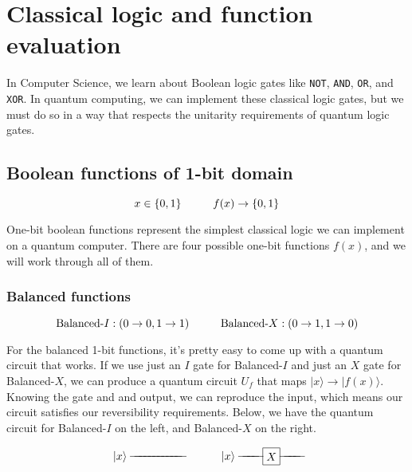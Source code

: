 \documentclass[12pt, letterpaper]{article}
\makeatletter
\def\w{\ar@{-}[l]}
\def\A#1{\save []="#1" \restore}
\def\op#1{*+[F]{\rule[-0.2ex]{0ex}{2.1ex}#1}}	%
\def\n{*-{}\w}
\def\>{\rangle}
\def\q#1{*+{\rule[-0.2ex]{0ex}{2.1ex}|#1\>}}
\makeatother
\begin{document}
\section{Classical logic and function evaluation}

In Computer Science, we learn about Boolean logic gates like \texttt{NOT},
\texttt{AND}, \texttt{OR}, and \texttt{XOR}. In quantum computing, we can implement these classical logic gates, but we must do so in a way that respects the unitarity requirements of quantum logic gates.

\subsection{Boolean functions of 1-bit domain}
\vspace{2 mm}

\begin{equation}
x \in \{0,1\} \hspace{1cm} f(x) \rightarrow \{0,1\} \vspace{2 mm}
\end{equation}

\noindent
One-bit boolean functions represent the simplest classical logic we can implement on a quantum computer. There are four possible one-bit functions $f(x)$, and we will work through all of them.

\subsubsection{Balanced functions}
\vspace{2 mm}
$$\text{Balanced-}I : (0 \rightarrow 0,  1 \rightarrow 1)
\hspace{1 cm}
\text{Balanced-}X : (0 \rightarrow 1,  1 \rightarrow 0) \vspace{2 mm}$$

\noindent
For the balanced 1-bit functions, it’s pretty easy to come up with a quantum circuit that works. If we use just an $I$ gate for Balanced-$I$ and just an $X$ gate for Balanced-$X$, we can produce a quantum circuit $U_f$ that maps $|x\rangle \rightarrow |f(x)\rangle$. Knowing the gate and and output, we can reproduce the input, which means our circuit satisfies our reversibility requirements. Below, we have the quantum circuit for Balanced-$I$ on the left, and Balanced-$X$ on the right.

\def\gAxA{\op{X}\w\A{gAxA}}
\def\bA{ \q{x}}
\begin{equation}
\xymatrix@R=5pt@C=10pt{
    \bA &\n &\n &\n &\n &\n &\n &\n &\n &\n &\n &\n
}\hspace{1 cm}
\xymatrix@R=5pt@C=10pt{
    \bA &\n &\n &\n &\gAxA &\n &\n &\n &\n
}
\end{equation}
\end{document}
